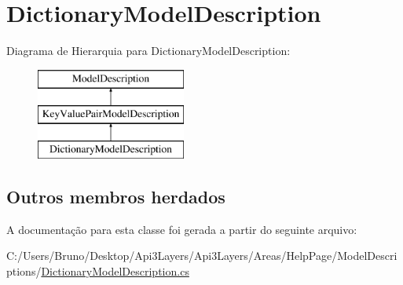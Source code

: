\hypertarget{classApi3Layers_1_1Areas_1_1HelpPage_1_1ModelDescriptions_1_1DictionaryModelDescription}{}\section{Dictionary\+Model\+Description}
\label{classApi3Layers_1_1Areas_1_1HelpPage_1_1ModelDescriptions_1_1DictionaryModelDescription}
Diagrama de Hierarquia para Dictionary\+Model\+Description\+:\begin{figure}[H]
\begin{center}
\leavevmode
\includegraphics[height=3.000000cm]{d9/d5d/classApi3Layers_1_1Areas_1_1HelpPage_1_1ModelDescriptions_1_1DictionaryModelDescription}
\end{center}
\end{figure}
\subsection*{Outros membros herdados}


A documentação para esta classe foi gerada a partir do seguinte arquivo\+:\begin{DoxyCompactItemize}
\item 
C\+:/\+Users/\+Bruno/\+Desktop/\+Api3\+Layers/\+Api3\+Layers/\+Areas/\+Help\+Page/\+Model\+Descriptions/\hyperlink{DictionaryModelDescription_8cs}{Dictionary\+Model\+Description.\+cs}\end{DoxyCompactItemize}
